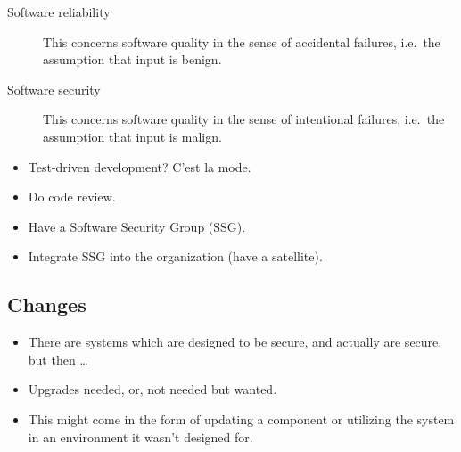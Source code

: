 \begin{frame}
  \begin{description}
    \item[Software reliability] This concerns software quality in the sense of 
      accidental failures, i.e.\ the assumption that input is benign.

      \pause{}

    \item[Software security] This concerns software quality in the sense of 
      intentional failures, i.e.\ the assumption that input is malign.
  \end{description}
\end{frame}

\begin{frame}
  \begin{question}
    \begin{itemize}
      \item Test-driven development? C'est la mode.
    \end{itemize}
  \end{question}

  \pause

  \begin{solution}
    \begin{itemize}
      \item Do code review.
      \item Have a Software Security Group (SSG).
      \item Integrate SSG into the organization (have a satellite).
    \end{itemize}
  \end{solution}
\end{frame}

\subsection{Changes}


\begin{frame}
  \begin{remark}
    \begin{itemize}
      \item There are systems which are designed to be secure, and actually are 
        secure, but then \dots

      \item Upgrades needed, or, not needed but wanted.

      \item This might come in the form of updating a component or utilizing the 
        system in an environment it wasn't designed for.

    \end{itemize}
  \end{remark}
\end{frame}


